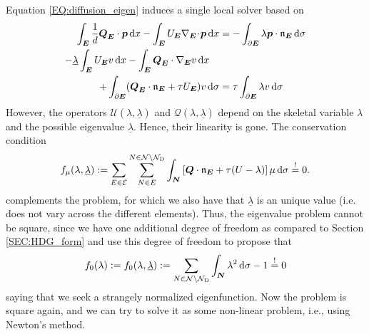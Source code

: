 \documentclass[a4paper, english, 12pt, reqno, draft]{amsart}
\theoremstyle{definition}
\theoremstyle{remark}
\numberwithin{equation}{section}
\newcommand{\setEdge}{\ensuremath{\mathcal E}}
\newcommand{\setNode}{\ensuremath{\mathcal N}}
\newcommand{\setNodeDir}{\ensuremath{\setNode_\textup D}}
\newcommand{\edge}{\ensuremath{E}}
\newcommand{\node}{\ensuremath{N}}
\newcommand{\Edge}{{\ensuremath{\boldsymbol E}}}
\newcommand{\Node}{{\ensuremath{\boldsymbol N}}}
\newcommand{\Nabla}{\ensuremath{\nabla_\Edge}}
\newcommand{\Div}{\ensuremath{\Nabla\!\cdot\!}}
\newcommand{\Normal}{\ensuremath{\mathfrak n_\Edge}}
\renewcommand{\vec}[1]{\ensuremath{\boldsymbol{#1}}}
\newcommand{\dx}{\ensuremath{\, \textup d x}}
\newcommand{\ds}{\ensuremath{\, \textup d \sigma}}
\newcommand{\localU}{\ensuremath{\mathcal U}}
\newcommand{\localQ}{\ensuremath{\vec{\mathcal Q}}}
\newcommand{\eigenval}{\ensuremath{\underline \lambda}}
\begin{document}
Equation \eqref{EQ:diffusion_eigen} induces a single local solver based on
% 
\begin{subequations}\label{EQ:hdg_scheme_eigen}
 \begin{align}
  \int_\Edge \frac{1}{d} \vec Q_\Edge \cdot \vec p \dx - \int_\Edge U_\Edge \Div \vec p \dx & = - \int_{\partial \Edge} \lambda \vec p \cdot \Normal \ds\\
  - \eigenval \int_\Edge U_\Edge v \dx - \int_\Edge \vec Q_\Edge \cdot \Nabla v \dx \quad \notag\\
  + \int_{\partial \Edge} ( \vec Q_\Edge \cdot \Normal + \tau  U_\Edge ) v \ds
  & = \tau \int_{\partial \Edge} \lambda v \ds
 \end{align}
\end{subequations}
% 
However, the operators $\localU(\lambda, \eigenval)$ and $\localQ(\lambda, \eigenval)$ depend on the skeletal variable $\lambda$ and the possible eigenvalue $\eigenval$. Hence, their linearity is gone. The conservation condition 
% 
\begin{equation*}
 f_\mu (\lambda,\eigenval) := \sum_{\edge \in \setEdge} \sum^{\node \in \setNode \setminus \setNodeDir}_{\node \in \edge} \int_\Node \left[ \vec Q \cdot \Normal + \tau (U - \lambda) \right] \mu \ds \overset{!}= 0.
\end{equation*}
% 
complements the problem, for which we also have that $\eigenval$ is an unique value (i.e. does not vary across the different elements). Thus, the eigenvalue problem cannot be square, since we have one additional degree of freedom as compared to Section \ref{SEC:HDG_form} and use this degree of freedom to propose that
% 
\begin{equation*}
 f_0(\lambda) := f_0 (\lambda,\eigenval) := \sum_{\node \in \setNode \setminus \setNodeDir} \int_\Node \lambda^2 \ds - 1 \overset{!}= 0
\end{equation*}
% 
saying that we seek a strangely normalized eigenfunction. Now the problem is square again, and we can try to solve it as some non-linear problem, i.e., using Newton's method.
\end{document}
